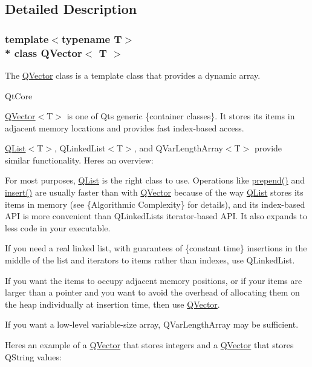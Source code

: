 \subsection{Detailed Description}
\subsubsection*{template$<$typename T$>$\\*
class Q\+Vector$<$ T $>$}

The \hyperlink{class_q_vector}{Q\+Vector} class is a template class that provides a dynamic array. 

Qt\+Core

\hyperlink{class_q_vector}{Q\+Vector}$<$T$>$ is one of Qt\textquotesingle{}s generic \{container classes\}. It stores its items in adjacent memory locations and provides fast index-\/based access.

\hyperlink{class_q_list}{Q\+List}$<$T$>$, Q\+Linked\+List$<$T$>$, and Q\+Var\+Length\+Array$<$T$>$ provide similar functionality. Here\textquotesingle{}s an overview\+:

\begin{DoxyItemize}
\item For most purposes, \hyperlink{class_q_list}{Q\+List} is the right class to use. Operations like \hyperlink{class_q_vector_a94da89ec9a0c1b5205065ecf08ec1a7d}{prepend()} and \hyperlink{class_q_vector_a8567b12d7fa5d23de69ba87e27646ee5}{insert()} are usually faster than with \hyperlink{class_q_vector}{Q\+Vector} because of the way \hyperlink{class_q_list}{Q\+List} stores its items in memory (see \{Algorithmic Complexity\} for details), and its index-\/based A\+PI is more convenient than Q\+Linked\+List\textquotesingle{}s iterator-\/based A\+PI. It also expands to less code in your executable. \item If you need a real linked list, with guarantees of \{constant time\} insertions in the middle of the list and iterators to items rather than indexes, use Q\+Linked\+List. \item If you want the items to occupy adjacent memory positions, or if your items are larger than a pointer and you want to avoid the overhead of allocating them on the heap individually at insertion time, then use \hyperlink{class_q_vector}{Q\+Vector}. \item If you want a low-\/level variable-\/size array, Q\+Var\+Length\+Array may be sufficient. \end{DoxyItemize}
Here\textquotesingle{}s an example of a \hyperlink{class_q_vector}{Q\+Vector} that stores integers and a \hyperlink{class_q_vector}{Q\+Vector} that stores Q\+String values\+:


